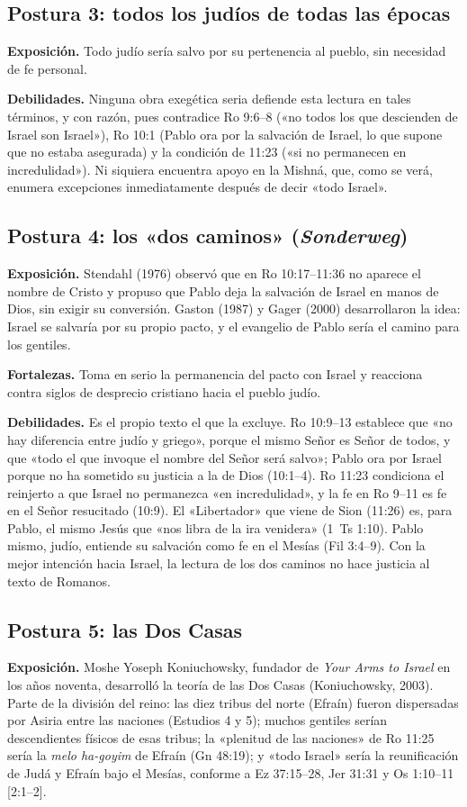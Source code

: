 \documentclass[11pt,letterpaper]{article}
\begin{document}
\subsection{Postura 3: todos los judíos de todas las épocas}
\textbf{Exposición.} Todo judío sería salvo por su pertenencia al pueblo, sin necesidad de fe personal.

\textbf{Debilidades.} Ninguna obra exegética seria defiende esta lectura en tales términos, y con razón, pues contradice Ro 9:6--8 («no todos los que descienden de Israel son Israel»), Ro 10:1 (Pablo ora por la salvación de Israel, lo que supone que no estaba asegurada) y la condición de 11:23 («si no permanecen en incredulidad»). Ni siquiera encuentra apoyo en la Mishná, que, como se verá, enumera excepciones inmediatamente después de decir «todo Israel».

\subsection{Postura 4: los «dos caminos» (\emph{Sonderweg})}
\textbf{Exposición.} Stendahl (1976) observó que en Ro 10:17--11:36 no aparece el nombre de Cristo y propuso que Pablo deja la salvación de Israel en manos de Dios, sin exigir su conversión. Gaston (1987) y Gager (2000) desarrollaron la idea: Israel se salvaría por su propio pacto, y el evangelio de Pablo sería el camino para los gentiles.

\textbf{Fortalezas.} Toma en serio la permanencia del pacto con Israel y reacciona contra siglos de desprecio cristiano hacia el pueblo judío.

\textbf{Debilidades.} Es el propio texto el que la excluye. Ro 10:9--13 establece que «no hay diferencia entre judío y griego», porque el mismo Señor es Señor de todos, y que «todo el que invoque el nombre del Señor será salvo»; Pablo ora por Israel porque no ha sometido su justicia a la de Dios (10:1--4). Ro 11:23 condiciona el reinjerto a que Israel no permanezca «en incredulidad», y la fe en Ro 9--11 es fe en el Señor resucitado (10:9). El «Libertador» que viene de Sion (11:26) es, para Pablo, el mismo Jesús que «nos libra de la ira venidera» (1~Ts 1:10). Pablo mismo, judío, entiende su salvación como fe en el Mesías (Fil 3:4--9). Con la mejor intención hacia Israel, la lectura de los dos caminos no hace justicia al texto de Romanos.

\subsection{Postura 5: las Dos Casas}
\textbf{Exposición.} Moshe Yoseph Koniuchowsky, fundador de \emph{Your Arms to Israel} en los años noventa, desarrolló la teoría de las Dos Casas (Koniuchowsky, 2003). Parte de la división del reino: las diez tribus del norte (Efraín) fueron dispersadas por Asiria entre las naciones (Estudios 4 y 5); muchos gentiles serían descendientes físicos de esas tribus; la «plenitud de las naciones» de Ro 11:25 sería la \emph{melo ha-goyim} de Efraín (Gn 48:19); y «todo Israel» sería la reunificación de Judá y Efraín bajo el Mesías, conforme a Ez 37:15--28, Jer 31:31 y Os 1:10--11 [2:1--2].
\end{document}
